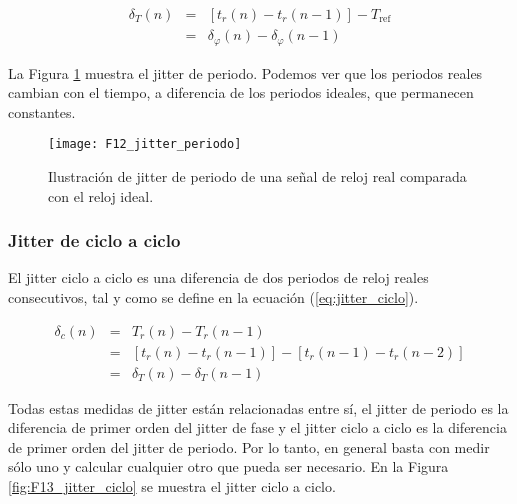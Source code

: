                 \begin{eqnarray}
                    \delta_{T}(n) & = & [t_{r} (n) - t_{r} (n-1)] - T_{\text{ref}}\\
                                  & = & \delta_{\varphi}(n) - \delta_{\varphi}(n-1)
                    \label{eq:jitter_periodo}
                \end{eqnarray}

                La Figura \ref{fig:F12_jitter_periodo} muestra el jitter de periodo. Podemos ver que los periodos reales cambian con el tiempo, a diferencia de los periodos ideales, que permanecen constantes.

                \begin{figure}[hbtp]
                    \caption{Ilustración de jitter de periodo de una señal de reloj real comparada con el reloj ideal.}
                    \centering
                    \texttt{[image: F12\_jitter\_periodo]}
                    \label{fig:F12_jitter_periodo}
                \end{figure}

            \subsubsection{Jitter de ciclo a ciclo}

                El jitter ciclo a ciclo es una diferencia de dos periodos de reloj reales consecutivos, tal y como se define en la ecuación (\ref{eq:jitter_ciclo}).
                
                \begin{eqnarray}
                    \delta_{c}(n) & = & T_{r} (n) - T_{r} (n-1)\\
                                  & = & [t_{r}(n) - t_{r}(n-1)] - [t_{r}(n-1) - t_{r}(n-2)] \\
                                  & = & \delta_{T}(n) - \delta_{T}(n-1)
                    \label{eq:jitter_ciclo}
                \end{eqnarray}

                Todas estas medidas de jitter están relacionadas entre sí, el jitter de periodo es la diferencia de primer orden del jitter de fase y el jitter ciclo a ciclo es la diferencia de primer orden del jitter de periodo. Por lo tanto, en general basta con medir sólo uno y calcular cualquier otro que pueda ser necesario. En la Figura \ref{fig:F13_jitter_ciclo} se muestra el jitter ciclo a ciclo.

